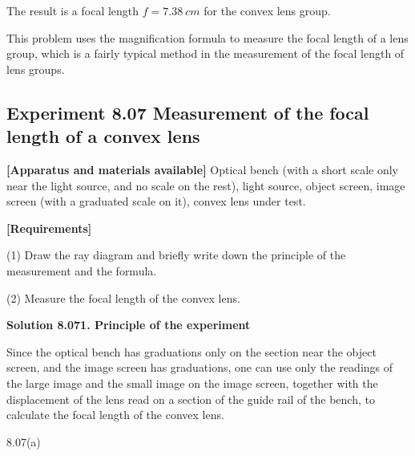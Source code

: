 The result is a focal length $f=\SI{7.38}{cm}$ for the convex lens group.

\begin{commentary}
This problem uses the magnification formula to measure the focal length of a lens group, which is a fairly typical method in the measurement of the focal length of lens groups.
\end{commentary}

\subsection*{Experiment 8.07 \quad Measurement of the focal length of a convex lens}

\textbf{[Apparatus and materials available]} Optical bench (with a short scale only near the light source, and no scale on the rest), light source, object screen, image screen (with a graduated scale on it), convex lens under test.

\textbf{[Requirements]}

(1) Draw the ray diagram and briefly write down the principle of the measurement and the formula.

(2) Measure the focal length of the convex lens.

\textbf{Solution 8.07}\quad \textbf{1. Principle of the experiment}

Since the optical bench has graduations only on the section near the object screen, and the image screen has graduations, one can use only the readings of the large image and the small image on the image screen, together with the displacement of the lens read on a section of the guide rail of the bench, to calculate the focal length of the convex lens.

\begin{figbox}{8.07(a)}
\end{figbox}

